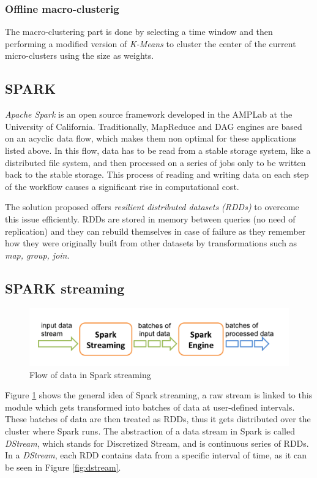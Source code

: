 \subsubsection{Offline macro-clusterig}

The macro-clustering part is done by selecting a time window and then performing a modified version of \textit{K-Means} to cluster the center of the current micro-clusters using the size as weights. 

\subsection{SPARK}
\textit{Apache Spark} is an open source framework developed in the AMPLab at the University of California.
Traditionally, MapReduce and DAG engines are based on an acyclic data flow, which makes them non optimal for these applications listed above. In this flow, data has to be read from a stable storage system, like a distributed file system, and then processed on a series of jobs only to be written back to the stable storage. This process of reading and writing data on each step of the workflow causes a significant rise in computational cost.

The solution proposed offers \textit{resilient distributed datasets (RDDs)} to overcome this issue efficiently. RDDs are stored in memory between queries (no need of replication) and they can rebuild themselves in case of failure as they remember how they were originally built from other datasets by transformations such as \textit{map, group, join}.

\subsection{SPARK streaming}

\begin{figure}[h!]
 \centering
 \includegraphics[scale=0.45]{./styles/streaming-flow.png}
 \caption{Flow of data in Spark streaming}
 \label{fig:streamFlow}
\end{figure}

Figure \ref{fig:streamFlow} shows the general idea of Spark streaming\cite{sparkStreaming}, a raw stream is linked to this module which gets transformed into batches of data at user-defined intervals. These batches of data are then treated as RDDs, thus it gets distributed over the cluster where Spark runs. The abstraction of a data stream in Spark is called \textit{DStream}, which stands for Discretized Stream, and is continuous series of RDDs. In a \textit{DStream}, each RDD contains data from a specific interval of time, as it can be seen in Figure \ref{fig:dstream}.


